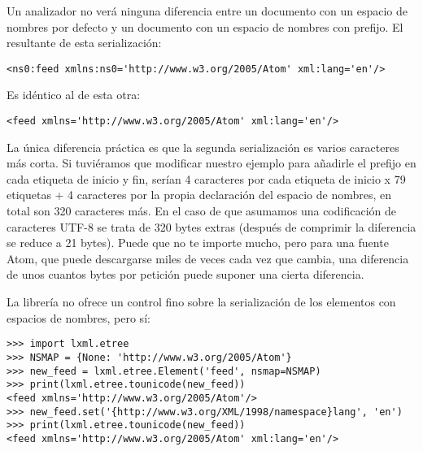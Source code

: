 Un analizador  no verá ninguna diferencia entre un documento  con un espacio de nombres por defecto y un documento  con un espacio de nombres con prefijo. El  resultante de esta serialización:

\noindent\begin{minipage}{\textwidth}
\begin{lstlisting}[mathescape=True]
<ns0:feed xmlns:ns0='http://www.w3.org/2005/Atom' xml:lang='en'/>
\end{lstlisting}
\end{minipage}

Es idéntico al  de esta otra:

\noindent\begin{minipage}{\textwidth}
\begin{lstlisting}[mathescape=True]
<feed xmlns='http://www.w3.org/2005/Atom' xml:lang='en'/>
\end{lstlisting}
\end{minipage}

La única diferencia práctica es que la segunda serialización es varios caracteres más corta. Si tuviéramos que modificar nuestro ejemplo para añadirle el prefijo  en cada etiqueta de inicio y fin, serían 4 caracteres por cada etiqueta de inicio x 79 etiquetas + 4 caracteres por la propia declaración del espacio de nombres, en total son 320 caracteres más. En el caso de que asumamos una codificación de caracteres UTF-8 se trata de 320 bytes extras (después de comprimir la diferencia se reduce a 21 bytes). Puede que no te importe mucho, pero para una fuente Atom, que puede descargarse miles de veces cada vez que cambia, una diferencia de unos cuantos bytes por petición puede suponer una cierta diferencia.

La librería  no ofrece un control fino sobre la serialización de los elementos con espacios de nombres, pero  sí:

\noindent\begin{minipage}{\textwidth}
\begin{lstlisting}[mathescape=True]
>>> import lxml.etree
>>> NSMAP = {None: 'http://www.w3.org/2005/Atom'}
>>> new_feed = lxml.etree.Element('feed', nsmap=NSMAP)
>>> print(lxml.etree.tounicode(new_feed))
<feed xmlns='http://www.w3.org/2005/Atom'/>
>>> new_feed.set('{http://www.w3.org/XML/1998/namespace}lang', 'en')
>>> print(lxml.etree.tounicode(new_feed))
<feed xmlns='http://www.w3.org/2005/Atom' xml:lang='en'/>
\end{lstlisting}
\end{minipage}

